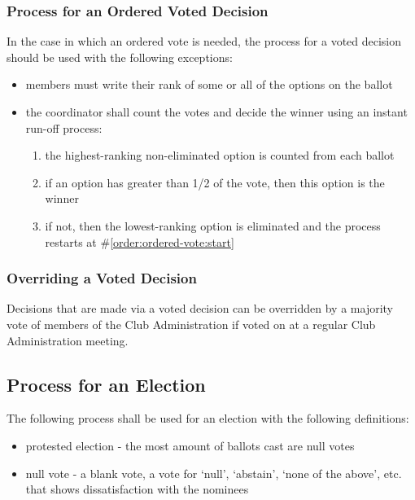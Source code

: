 \documentclass[english,11pt]{article}
\begin{document}
\subsubsection{Process for an Ordered Voted Decision} \label{subsect:decision:voted:ordered}
In the case in which an ordered vote is needed, the process for a voted decision should be used with the following exceptions:

\begin{itemize}
    \item members must write their rank of some or all of the options on the ballot
    \item the coordinator shall count the votes and decide the winner using an instant run-off process:
    \begin{enumerate}
        \item \label{order:ordered-vote:start} the highest-ranking non-eliminated option is counted from each ballot
        \item if an option has greater than 1/2 of the vote, then this option is the winner
        \item if not, then the lowest-ranking option is eliminated and the process restarts at \#\ref{order:ordered-vote:start}
    \end{enumerate}
\end{itemize}

\subsubsection{Overriding a Voted Decision} \label{subsect:decision:voted:override}
Decisions that are made via a voted decision can be overridden by a majority vote of members of the Club Administration if voted on at a regular Club Administration meeting.

\subsection{Process for an Election} \label{sect:decision:election}
The following process shall be used for an election with the following definitions:

\begin{itemize}
    \item protested election - the most amount of ballots cast are null votes
    \item null vote - a blank vote, a vote for `null', `abstain', `none of the above', etc. that shows dissatisfaction with the nominees
\end{itemize}
\end{document}
